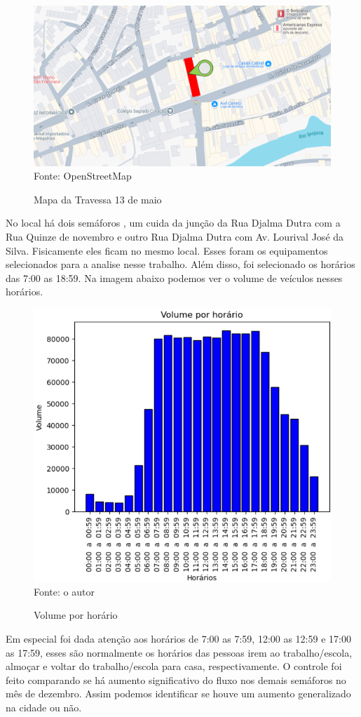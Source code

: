 \begin{figure}[H]
    \centering
    \caption{Mapa da Travessa 13 de maio}
    \includegraphics[width=0.7\linewidth]{Imagens/map.png}
    {\footnotesize \\Fonte: OpenStreetMap}
    \label{fig:mapa}
\end{figure}
No local há dois semáforos , um cuida da junção da Rua Djalma Dutra com a Rua Quinze de novembro e outro Rua Djalma Dutra com Av. Lourival José da Silva. Fisicamente eles ficam no mesmo local. Esses foram os equipamentos selecionados para a analise nesse trabalho. Além disso, foi selecionado os horários das 7:00 as 18:59. Na imagem abaixo podemos ver  o volume de veículos nesses horários.
\begin{figure}[H]
    \centering
    \caption{Volume por horário}
    \includegraphics[width=0.7\linewidth]{Imagens/volume.png}
    {\footnotesize\\ Fonte: o autor}
    \label{fig:volume}
\end{figure}
Em especial foi dada atenção aos horários de 7:00 as 7:59, 12:00 as 12:59 e 17:00 as 17:59, esses são normalmente os horários das pessoas irem ao trabalho/escola, almoçar e voltar do trabalho/escola para casa, respectivamente.
O controle foi feito comparando se há aumento significativo do fluxo nos demais semáforos no mês de dezembro. Assim podemos identificar se houve um aumento generalizado na cidade ou não.

